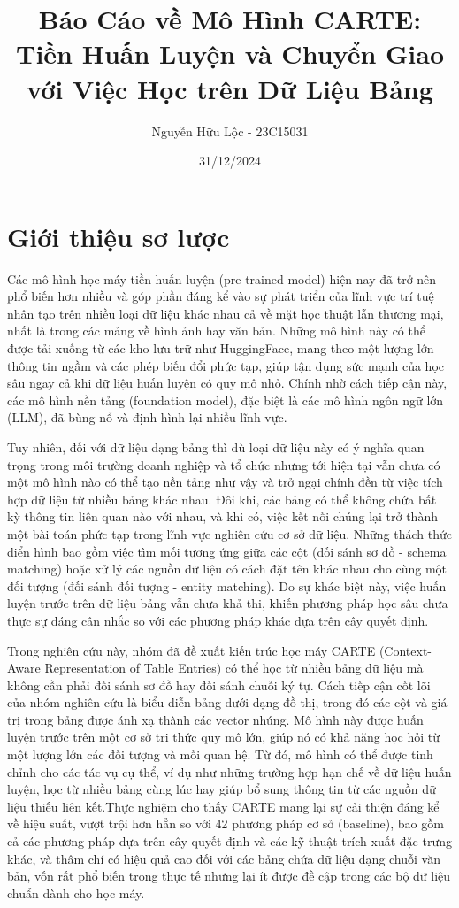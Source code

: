 \documentclass{article}
\title{Báo Cáo về Mô Hình CARTE: Tiền Huấn Luyện và Chuyển Giao với Việc Học trên Dữ Liệu Bảng}
\author{Nguyễn Hữu Lộc - 23C15031}
\date{31/12/2024}
\begin{document}
\maketitle

\tableofcontents


\section{Giới thiệu sơ lược}
Các mô hình học máy tiền huấn luyện (pre-trained model) hiện nay đã trở nên phổ biến hơn nhiều và góp phần đáng kể vào sự phát triển của lĩnh vực trí tuệ nhân tạo trên nhiều loại dữ liệu khác nhau cả về mặt học thuật lẫn thương mại, nhất là trong các mảng về hình ảnh hay văn bản. Những mô hình này có thể được tải xuống từ các kho lưu trữ như HuggingFace, mang theo một lượng lớn thông tin ngầm và các phép biến đổi phức tạp, giúp tận dụng sức mạnh của học sâu ngay cả khi dữ liệu huấn luyện có quy mô nhỏ. Chính nhờ cách tiếp cận này, các mô hình nền tảng (foundation model), đặc biệt là các mô hình ngôn ngữ lớn (LLM), đã bùng nổ và định hình lại nhiều lĩnh vực.

Tuy nhiên, đối với dữ liệu dạng bảng thì dù loại dữ liệu này có ý nghĩa quan trọng trong môi trường doanh nghiệp và tổ chức nhưng tới hiện tại vẫn chưa có một mô hình nào có thể tạo nền tảng như vậy và trở ngại chính đền từ việc tích hợp dữ liệu từ nhiều bảng khác nhau. Đôi khi, các bảng có thể không chứa bất kỳ thông tin liên quan nào với nhau, và khi có, việc kết nối chúng lại trở thành một bài toán phức tạp trong lĩnh vực nghiên cứu cơ sở dữ liệu. Những thách thức điển hình bao gồm việc tìm mối tương ứng giữa các cột (đối sánh sơ đồ - schema matching) hoặc xử lý các nguồn dữ liệu có cách đặt tên khác nhau cho cùng một đối tượng (đối sánh đối tượng - entity matching). Do sự khác biệt này, việc huấn luyện trước trên dữ liệu bảng vẫn chưa khả thi, khiến phương pháp học sâu chưa thực sự đáng cân nhắc so với các phương pháp khác dựa trên cây quyết định.

Trong nghiên cứu này, nhóm đã đề xuất kiến trúc học máy CARTE (Context-Aware Representation of Table Entries) có thể học từ nhiều bảng dữ liệu mà không cần phải đối sánh sơ đồ hay đối sánh chuỗi ký tự. Cách tiếp cận cốt lõi của nhóm nghiên cứu là biểu diễn bảng dưới dạng đồ thị, trong đó các cột và giá trị trong bảng được ánh xạ thành các vector nhúng. Mô hình này được huấn luyện trước trên một cơ sở tri thức quy mô lớn, giúp nó có khả năng học hỏi từ một lượng lớn các đối tượng và mối quan hệ. Từ đó, mô hình có thể được tinh chỉnh cho các tác vụ cụ thể, ví dụ như những trường hợp hạn chế về dữ liệu huấn luyện, học từ nhiều bảng cùng lúc hay giúp bổ sung thông tin từ các nguồn dữ liệu thiếu liên kết.Thực nghiệm cho thấy CARTE mang lại sự cải thiện đáng kể về hiệu suất, vượt trội hơn hẳn so với 42 phương pháp cơ sở (baseline), bao gồm cả các phương pháp dựa trên cây quyết định và các kỹ thuật trích xuất đặc trưng khác, và thâm chí có hiệu quả cao đối với các bảng chứa dữ liệu dạng chuỗi văn bản, vốn rất phổ biến trong thực tế nhưng lại ít được đề cập trong các bộ dữ liệu chuẩn dành cho học máy.
\end{document}
